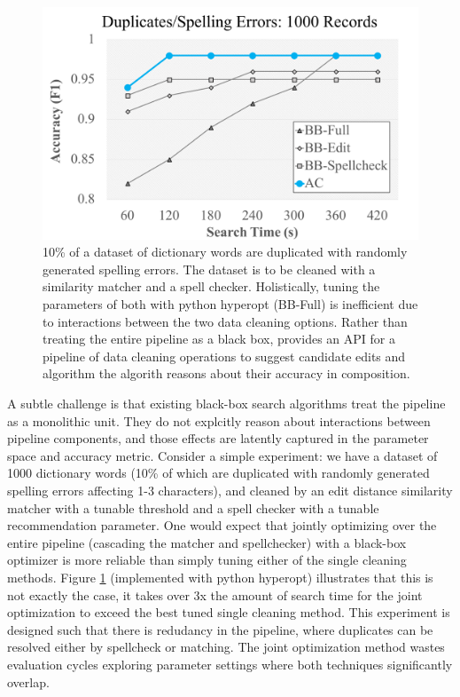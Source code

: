 \begin{figure}[t]
\centering
 \includegraphics[width=0.9\columnwidth]{figures/teaser-experiment.png}
 \caption{\small 10\% of a dataset of dictionary words are duplicated with randomly generated spelling errors. The dataset is to be cleaned with a similarity matcher and a spell checker. Holistically, tuning the parameters of both with \textsf{python hyperopt} (BB-Full) is inefficient due to interactions between the two data cleaning options. Rather than treating the entire pipeline as a black box, \sys provides an API for a pipeline of data cleaning operations to suggest candidate edits and algorithm the algorith reasons about their accuracy in composition. \label{fig:teaser}}
\end{figure}

A subtle challenge is that existing black-box search algorithms treat the pipeline as a monolithic unit.
They do not explcitly reason about interactions between pipeline components, and those effects are latently captured in the parameter space and accuracy metric.
Consider a simple experiment: we have a dataset of 1000 dictionary words (10\% of which are duplicated with randomly generated spelling errors affecting 1-3 characters), and cleaned by an edit distance similarity matcher with a tunable threshold and a spell checker with a tunable recommendation parameter.
 One would expect that jointly optimizing over the entire pipeline (cascading the matcher and spellchecker) with a black-box optimizer is more reliable than simply tuning either of the single cleaning methods. 
Figure \ref{fig:teaser} (implemented with \textsf{python hyperopt}) illustrates that this is not exactly the case, it takes over 3x the amount of search time for the joint optimization to exceed the best tuned single cleaning method.
This experiment is designed such that there is redudancy in the pipeline, where duplicates can be resolved either by spellcheck or matching.
The joint optimization method wastes evaluation cycles exploring parameter settings where both techniques significantly overlap.


